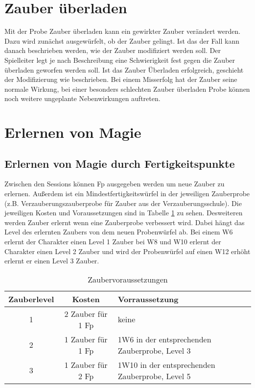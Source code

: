 \documentclass[../../Heldenanleitung2]{subfiles}
\begin{document}
\section{Zauber überladen}

Mit der Probe Zauber überladen kann ein gewirkter Zauber verändert werden. Dazu wird zunächst ausgewürfelt, ob der Zauber gelingt. Ist das der Fall kann danach beschrieben werden, wie der Zauber modifiziert werden soll. Der Spielleiter legt je nach Beschreibung eine Schwierigkeit fest gegen die Zauber überladen geworfen werden soll. Ist das Zauber Überladen erfolgreich, geschieht der Modifizierung wie beschrieben. Bei einem Misserfolg hat der Zauber seine normale Wirkung, bei einer besonders schlechten Zauber überladen Probe können noch weitere ungeplante Nebenwirkungen auftreten.

\section{Erlernen von Magie}


\subsection{Erlernen von Magie durch Fertigkeitspunkte}

Zwischen den Sessions können Fp ausgegeben werden um neue Zauber zu erlernen. Außerdem ist ein Mindestfertigkeitswürfel in der jeweiligen Zauberprobe (z.B. Verzauberungszauberprobe für Zauber aus der Verzauberungsschule). Die jeweiligen Kosten und Voraussetzungen sind in Tabelle \ref{tab:ZauberLernen} zu sehen. Desweiteren werden Zauber erlernt wenn eine Zauberprobe verbessert wird. Dabei hängt das Level des erlernten Zaubers von dem neuen Probenwürfel ab. Bei einem W6 erlernt der Charakter einen Level 1 Zauber bei W8 und W10 erlernt der Charakter einen Level 2 Zauber und wird der Probenwürfel auf einen W12 erhöht erlernt er einen Level 3 Zauber.

{
\begin{table}[h!]
\centering
\caption{Zaubervoraussetzungen}
\label{tab:ZauberLernen}
\begin{tabular}{|ccl|}
\hline
\textbf{Zauberlevel} & \textbf{Kosten} & \textbf{Vorraussetzung}\\ \hline
1 & 2 Zauber für 1 Fp & keine\\
2 & 1 Zauber für 1 Fp & 1W6 in der entsprechenden Zauberprobe, Level 3\\
3 & 1 Zauber für 2 Fp & 1W10 in der entsprechenden Zauberprobe, Level 5\\ \hline
\end{tabular}
\end{table}
}
\end{document}

